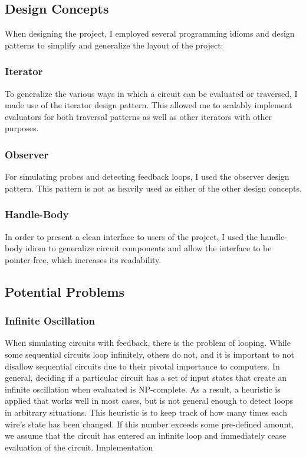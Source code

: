 \documentclass{article}
\begin{document}
\subsection{Design Concepts}

When designing the project, I employed several programming idioms and design patterns to simplify and generalize the layout of the project:

\subsubsection{Iterator}

To generalize the various ways in which a circuit can be evaluated or traversed, I made use of the iterator design pattern. This allowed me to scalably implement evaluators for both traversal patterns as well as other iterators with other purposes.

\subsubsection{Observer}

For simulating probes and detecting feedback loops, I used the observer design pattern. This pattern is not as heavily used as either of the other design concepts.

\subsubsection{Handle-Body}

In order to present a clean interface to users of the project, I used the handle-body idiom to generalize circuit components and allow the interface to be pointer-free, which increases its readability.

\subsection{Potential Problems}

\subsubsection{Infinite Oscillation}

When simulating circuits with feedback, there is the problem of looping. While some sequential circuits loop infinitely, others do not, and it is important to not disallow sequential circuits due to their pivotal importance to computers. In general, deciding if a particular circuit has a set of input states that create an infinite oscillation when evaluated is NP-complete. As a result, a heuristic is applied that works well in most cases, but is not general enough to detect loops in arbitrary situations. This heuristic is to keep track of how many times each wire’s state has been changed. If this number exceeds some pre-defined amount, we assume that the circuit has entered an infinite loop and immediately cease evaluation of the circuit.
Implementation
\end{document}
